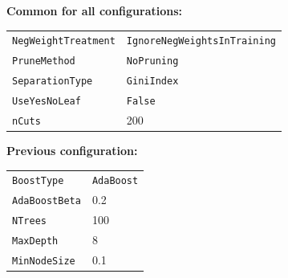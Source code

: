 \noindent\textbf{Common for all configurations:}\\[0.3em]
\begin{tabular}{ll}
  \texttt{NegWeightTreatment} & \texttt{IgnoreNegWeightsInTraining} \\
  \texttt{PruneMethod} & \texttt{NoPruning} \\
  \texttt{SeparationType} & \texttt{GiniIndex} \\
  \texttt{UseYesNoLeaf} & \texttt{False} \\
  \texttt{nCuts} & 200
\end{tabular}

\vspace*{1em}

\noindent\textbf{Previous configuration:}\\[0.3em]
\begin{tabular}{ll}
  \texttt{BoostType} & \texttt{AdaBoost} \\
  \texttt{AdaBoostBeta} & 0.2 \\
  \texttt{NTrees} & 100 \\
  \texttt{MaxDepth} & 8 \\
  \texttt{MinNodeSize} & 0.1 \\
\end{tabular}

\vspace*{1em}

